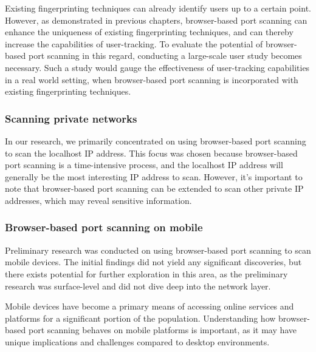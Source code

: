Existing fingerprinting techniques can already identify users up to a certain point. However, as demonstrated in previous chapters, browser-based port scanning can enhance the uniqueness of existing fingerprinting techniques, and can thereby increase the capabilities of user-tracking.
To evaluate the potential of browser-based port scanning in this regard, conducting a large-scale user study becomes necessary. Such a study would gauge the effectiveness of user-tracking capabilities in a real world setting, when browser-based port scanning is incorporated with existing fingerprinting techniques.

\subsubsection{Scanning private networks}

In our research, we primarily concentrated on using browser-based port scanning to scan the localhost IP address. This focus was chosen because browser-based port scanning is a time-intensive process, and the localhost IP address will generally be the most interesting IP address to scan. However, it's important to note that browser-based port scanning can be extended to scan other private IP addresses, which may reveal sensitive information.

\subsubsection{Browser-based port scanning on mobile}

Preliminary research was conducted on using browser-based port scanning to scan mobile devices. The initial findings did not yield any significant discoveries, but there exists potential for further exploration in this area, as the preliminary research was surface-level and did not dive deep into the network layer.

Mobile devices have become a primary means of accessing online services and platforms for a significant portion of the population. Understanding how browser-based port scanning behaves on mobile platforms is important, as it may have unique implications and challenges compared to desktop environments.




